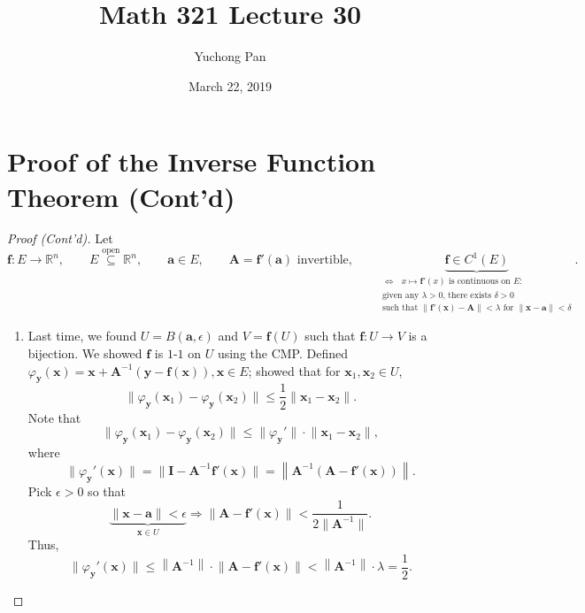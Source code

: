 \documentclass[letterpaper, reqno,11pt]{article}
\newcommand{\RR}{\mathbb{R}}
\begin{document}
\title{Math 321 Lecture 30}
\author{Yuchong Pan}
\date{March 22, 2019}
\newtheorem{thm}{Theorem}
\newtheorem{defn}{Definition}
\newtheorem*{remark}{Remark}
\newtheorem{claim}{Claim}
\newtheorem{cor}{Corollary}
\newtheorem{lemma}{Lemma}
\newtheorem{prop}{Proposition}
\newtheorem{fact}{Fact}
\maketitle
%

\section{Proof of the Inverse Function Theorem (Cont'd)}

\begin{proof}[Proof (Cont'd)]
  \renewcommand{\qedsymbol}{}
  
  Let
  \[ \mathbf f : E \to \RR^n, \qquad E \overset{\text{open}}{\subseteq} \RR^n, \qquad \mathbf a \in E, \qquad \mathbf A = \mathbf f'(\mathbf a) \text{ invertible}, \qquad \underbrace{\mathbf f \in C^1(E)}_{\substack{\text{$\Leftrightarrow$ $x \mapsto \mathbf f'(x)$ is continuous on $E$:} \\ \text{given any $\lambda > 0$, there exists $\delta > 0$} \\ \text{such that $\lVert \mathbf f'(\mathbf x) - \mathbf A \rVert < \lambda$ for $\lVert \mathbf x - \mathbf a \rVert < \delta$}}}. \]

  \begin{enumerate}
  \item Last time, we found $U = B(\mathbf a, \epsilon)$ and $V = \mathbf f(U)$ such that $\mathbf f : U \to V$ is a bijection. We showed $\mathbf f$ is $1$-$1$ on $U$ using the CMP. Defined $\varphi_{\mathbf y}(\mathbf x) = \mathbf x + \mathbf A^{-1} (\mathbf y - \mathbf f(\mathbf x)), \mathbf x \in E$; showed that for $\mathbf x_1, \mathbf x_2 \in U$,
    \begin{equation} \label{eq:*} \tag{*}
      \boxed{\lVert \varphi_{\mathbf y} (\mathbf x_1) - \varphi_{\mathbf y}(\mathbf x_2) \rVert \leq \frac{1}{2} \lVert \mathbf x_1 - \mathbf x_2 \rVert.}
    \end{equation}
    Note that
    \[ \lVert \varphi_{\mathbf y}(\mathbf x_1) - \varphi_{\mathbf y}(\mathbf x_2) \rVert \leq \lVert \varphi_{\mathbf y}' \rVert \cdot \lVert \mathbf x_1 - \mathbf x_2 \rVert, \]
    where
    \[ \lVert \varphi_{\mathbf y}'(\mathbf x) \rVert = \lVert \mathbf I - \mathbf A^{-1} \mathbf f'(\mathbf x) \rVert = \left\lVert \mathbf A^{-1} (\mathbf A - \mathbf f'(\mathbf x)) \right\rVert. \]
    Pick $\epsilon > 0$ so that
    \[ \underbrace{\lVert \mathbf x - \mathbf a \rVert < \epsilon}_{\mathbf x \in U} \Rightarrow \lVert \mathbf A - \mathbf f'(\mathbf x) \rVert < \frac{1}{2 \lVert \mathbf A^{-1} \rVert}. \]
    Thus,
    \[ \lVert \varphi_{\mathbf y}'(\mathbf x) \rVert \leq \left\lVert \mathbf A^{-1} \right\rVert \cdot \lVert \mathbf A - \mathbf f'(\mathbf x) \rVert < \left\lVert \mathbf A^{-1} \right\rVert \cdot \lambda = \frac{1}{2}. \]


\end{enumerate}
\end{proof}
\end{document}
